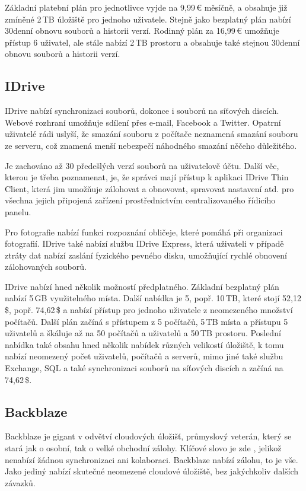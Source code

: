 \documentclass[
  glossaries,
]{kidiplom}
\begin{document}
Základní platební plán pro jednotlivce vyjde na 9,99\,€ měsíčně, a obsahuje již zmíněné 2\,TB úložiště pro jednoho uživatele. Stejně jako bezplatný plán nabízí 30denní obnovu souborů a historii verzí. Rodinný plán za 16,99\,€ umožňuje přístup 6 uživatel, ale stále nabízí 2\,TB prostoru a obsahuje také stejnou 30denní obnovu souborů a historii verzí. \cite{DROPBOXPRICE}

\subsection{IDrive}
IDrive nabízí synchronizaci souborů, dokonce i souborů na síťových discích. Webové rozhraní umožňuje sdílení přes e-mail, Facebook a Twitter. Opatrní uživatelé rádi uslyší, že smazání souboru z počítače neznamená smazání souboru ze serveru, což znamená menší nebezpečí náhodného smazání něčeho důležitého.

Je zachováno až 30 předešlých verzí souborů na uživatelově účtu. Další věc, kterou je třeba poznamenat, je, že správci mají přístup k aplikaci IDrive Thin Client, která jim umožňuje zálohovat a obnovovat, spravovat nastavení atd. pro všechna jejich připojená zařízení prostřednictvím centralizovaného řídicího panelu.

Pro fotografie nabízí funkci rozpoznání obličeje, které pomáhá při organizaci fotografií. IDrive také nabízí službu IDrive Express, která uživateli v případě ztráty dat nabízí zaslání fyzického pevného disku, umožňující rychlé obnovení zálohovaných souborů.

IDrive nabízí hned několik možností předplatného. Základní bezplatný plán nabízí 5\,GB využitelného místa. Další nabídka je 5, popř. 10\,TB, které stojí 52,12\,\$, popř. 74,62\,\$ a nabízí přístup pro jednoho uživatele z neomezeného množství počítačů. Další plán začíná s přístupem z 5 počítačů, 5\,TB místa a přístupu 5 uživatelů a škáluje až na 50 počítačů a uživatelů a 50\,TB prostoru. Poslední nabídka také obsahu hned několik nabídek různých velikostí úložiště, k tomu nabízí neomezený počet uživatelů, počítačů a serverů, mimo jiné také službu Exchange, SQL a také synchronizaci souborů na síťových discích a začíná na 74,62\,\$. \cite{IDRIVEPRICE}

\subsection{Backblaze}
Backblaze je gigant v odvětví cloudových úložišť, průmyslový veterán, který se stará jak o osobní, tak o velké obchodní zálohy. Klíčové slovo je zde , jelikož nenabízí žádnou synchronizaci ani kolaboraci. Backblaze nabízí zálohu, to je vše. Jako jediný nabízí skutečné neomezené cloudové úložiště, bez jakýchkoliv dalších závazků.
\end{document}
